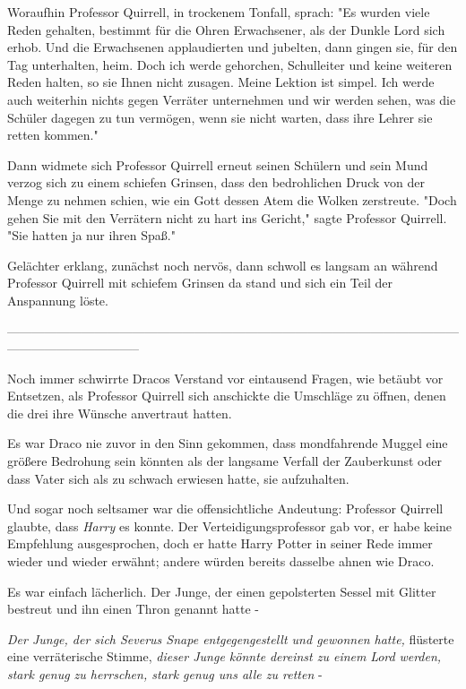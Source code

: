 {Woraufhin Professor Quirrell, in trockenem Tonfall, sprach: "Es wurden viele Reden gehalten, bestimmt für die Ohren Erwachsener, als der Dunkle Lord sich erhob. Und die Erwachsenen applaudierten und jubelten, dann gingen sie, für den Tag unterhalten, heim. Doch ich werde gehorchen, Schulleiter und keine weiteren Reden halten, so sie Ihnen nicht zusagen. Meine Lektion ist simpel. Ich werde auch weiterhin nichts gegen Verräter unternehmen und wir werden sehen, was die Schüler dagegen zu tun vermögen, wenn sie nicht warten, dass ihre Lehrer sie retten kommen."

Dann widmete sich Professor Quirrell erneut seinen Schülern und sein Mund verzog sich zu einem schiefen Grinsen, dass den bedrohlichen Druck von der Menge zu nehmen schien, wie ein Gott dessen Atem die Wolken zerstreute. "Doch gehen Sie mit den Verrätern nicht zu hart ins Gericht," sagte Professor Quirrell. "Sie hatten ja nur ihren Spaß."

Gelächter erklang, zunächst noch nervös, dann schwoll es langsam an während Professor Quirrell mit schiefem Grinsen da stand und sich ein Teil der Anspannung löste.

--------------------------------------------------------------------------------------------------------------------------------------------

Noch immer schwirrte Dracos Verstand vor eintausend Fragen, wie betäubt vor Entsetzen, als Professor Quirrell sich anschickte die Umschläge zu öffnen, denen die drei ihre Wünsche anvertraut hatten.

Es war Draco nie zuvor in den Sinn gekommen, dass mondfahrende Muggel eine größere Bedrohung sein könnten als der langsame Verfall der Zauberkunst oder dass Vater sich als zu schwach erwiesen hatte, sie aufzuhalten.

Und sogar noch seltsamer war die offensichtliche Andeutung: Professor Quirrell glaubte, dass \emph{Harry} es konnte. Der Verteidigungsprofessor gab vor, er habe keine Empfehlung ausgesprochen, doch er hatte Harry Potter in seiner Rede immer wieder und wieder erwähnt; andere würden bereits dasselbe ahnen wie Draco.

Es war einfach lächerlich. Der Junge, der einen gepolsterten Sessel mit Glitter bestreut und ihn einen Thron genannt hatte -

\emph{Der Junge, der sich Severus Snape entgegengestellt und gewonnen hatte,} flüsterte eine verräterische Stimme, \emph{dieser Junge könnte} \emph{dereinst zu einem} \emph{Lord} \emph{werden, stark genug zu herrschen, stark genug uns alle zu retten} -

}
